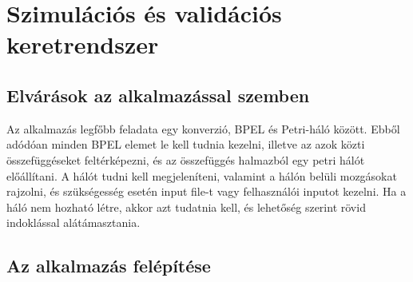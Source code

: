 \chapter{Szimulációs és validációs keretrendszer}
\section{Elvárások az alkalmazással szemben}

Az alkalmazás legfőbb feladata egy konverzió, BPEL és Petri-háló között. Ebből adódóan minden BPEL elemet le kell tudnia kezelni, illetve az azok közti összefüggéseket feltérképezni, és az összefüggés halmazból egy petri hálót előállítani. A hálót tudni kell megjeleníteni, valamint a hálón belüli mozgásokat rajzolni, és szükségesség esetén input file-t vagy felhasználói inputot kezelni. Ha a háló nem hozható létre, akkor azt tudatnia kell, és lehetőség szerint rövid indoklással alátámasztania. 

\section{Az alkalmazás felépítése}

